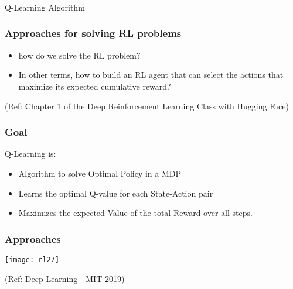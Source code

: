 \begin{frame}[fragile]\frametitle{}
\begin{center}
{\Large Q-Learning Algorithm}
\end{center}
\end{frame}


\begin{frame}[fragile]\frametitle{Approaches for solving RL problems}

\begin{itemize}
\item how do we solve the RL problem?
\item In other terms, how to build an RL agent that can select the actions that maximize its expected cumulative reward?
\end{itemize}

{\tiny (Ref: Chapter 1 of the Deep Reinforcement Learning Class with Hugging Face)}


\end{frame}


\begin{frame}[fragile]\frametitle{Goal}

Q-Learning is:

\begin{itemize}
\item Algorithm to solve Optimal Policy in a MDP
\item Learns the optimal Q-value for each State-Action pair
\item Maximizes the expected Value of the total Reward over all steps.
\end{itemize}

\end{frame}

\begin{frame}[fragile]\frametitle{Approaches}
\begin{center}
\texttt{[image: rl27]}
\end{center}

{\tiny (Ref: Deep Learning - MIT 2019)}

\end{frame}

